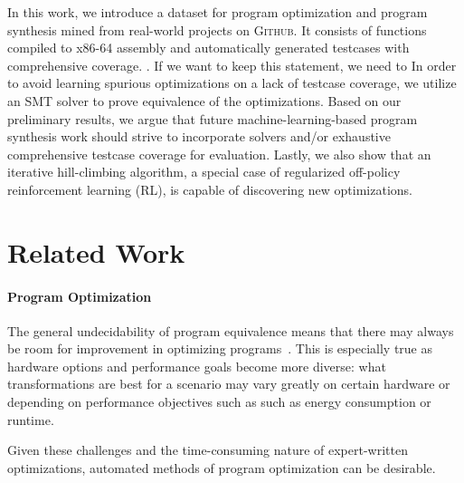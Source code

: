 \documentclass{article}
\begin{document}
In this work, we introduce a dataset for program optimization and program synthesis mined from real-world projects on \textsc{Github}. It consists of functions compiled to x86-64 assembly and automatically generated testcases with comprehensive coverage. .  If we want to keep this statement, we need to  In order to avoid learning spurious optimizations on a lack of testcase coverage, we utilize an SMT solver to prove equivalence of the optimizations. Based on our preliminary results, we argue that future machine-learning-based program synthesis work should strive to incorporate solvers and/or exhaustive comprehensive testcase coverage for evaluation. Lastly, we also show that an iterative hill-climbing algorithm, a special case of  regularized off-policy reinforcement learning (RL), is capable of discovering new optimizations.  

\section{Related Work}


\paragraph{Program Optimization}

The general undecidability of program equivalence means that there may always be room for improvement in optimizing programs~\citep{rice1953}. This is especially true as hardware options and performance goals become more diverse: what transformations are best for a scenario may vary greatly on certain hardware or depending on performance objectives such as such as energy consumption or runtime.   

Given these challenges and the time-consuming nature of expert-written optimizations, automated methods of program optimization can be desirable.
\end{document}
